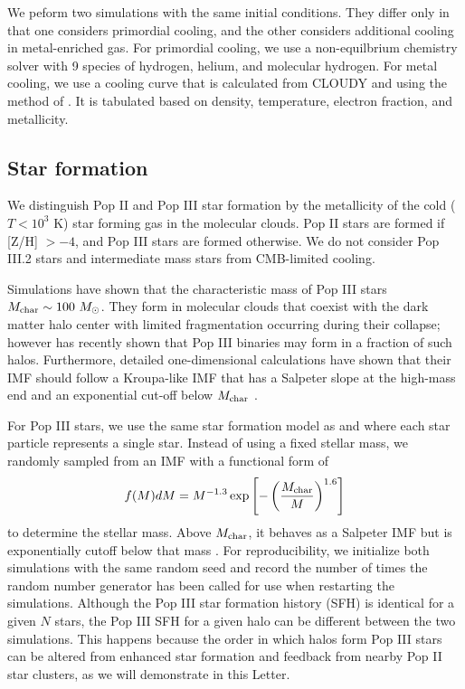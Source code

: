 \documentclass[apjl]{emulateapj}
\begin{document}
We peform two simulations with the same initial conditions.  They
differ only in that one considers primordial cooling, and the other
considers additional cooling in metal-enriched gas.  For primordial
cooling, we use a non-equilbrium chemistry solver with 9 species of
hydrogen, helium, and molecular hydrogen.  For metal cooling, we use a
cooling curve that is calculated from CLOUDY \citep{CLOUDY} and using
the method of \citet{2008MNRAS.385.1443S}.  It is tabulated based on
density, temperature, electron fraction, and metallicity.

\subsection{Star formation}

We distinguish Pop II and Pop III star formation by the metallicity of
the cold ($T < 10^3$ K) star forming gas in the molecular clouds.  Pop
II stars are formed if [Z/H] $> -4$, and Pop III stars are formed
otherwise.  We do not consider Pop III.2 stars and intermediate mass
stars from CMB-limited cooling.

Simulations have shown that the characteristic mass of Pop III stars
$M_{\rm char} \sim 100~\Ms$.  They form in molecular clouds that
coexist with the dark matter halo center with limited fragmentation
occurring during their collapse; however \citet{2009Sci...325..601T}
has recently shown that Pop III binaries may form in a fraction of
such halos.  Furthermore, detailed one-dimensional calculations have
shown that their IMF should follow a Kroupa-like IMF that has a
Salpeter slope at the high-mass end and an exponential cut-off below
$M_{\rm char}$ \citep{refs}.

For Pop III stars, we use the same star formation model as
\citet{Abel07} and \citet{Wise08_Gal} where each star particle
represents a single star.  Instead of using a fixed stellar mass, we
randomly sampled from an IMF with a functional form of
%
\begin{equation}
\label{eqn:imf}
f(M)dM = M^{-1.3} \exp\left[-\left(\frac{M_{\rm char}}{M}\right)^{1.6}\right]
\end{equation}
to determine the stellar mass.  Above $M_{\rm char}$, it behaves as a
Salpeter IMF but is exponentially cutoff below that mass
\citep{Chabrier03, Clark09}.  For reproducibility, we initialize both
simulations with the same random seed and record the number of times
the random number generator \citep[Mersenne twister;][]{ref} has been
called for use when restarting the simulations.  Although the Pop III
star formation history (SFH) is identical for a given $N$ stars, the
Pop III SFH for a given halo can be different between the two
simulations.  This happens because the order in which halos form Pop
III stars can be altered from enhanced star formation and feedback
from nearby Pop II star clusters, as we will demonstrate in this
Letter.
\end{document}
